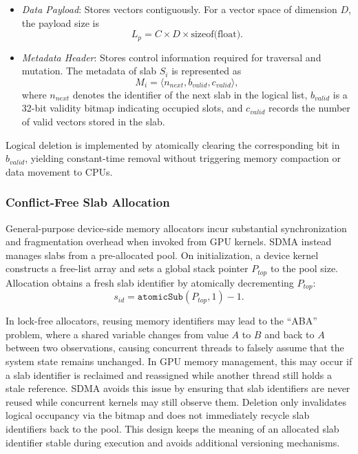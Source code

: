 \documentclass[sigconf,anonymous]{acmart}
\theoremstyle{plain}
\theoremstyle{definition}
\theoremstyle{remark}
\begin{document}
\begin{itemize}
    \item \textit{Data Payload}: Stores vectors contiguously. For a vector space of dimension $D$, the payload size is
    \[
        L_p = C \times D \times \text{sizeof(float)}.
    \]

    \item \textit{Metadata Header}: Stores control information required for traversal and mutation. The metadata of slab $S_i$ is represented as
    \begin{equation}
        M_i = \langle n_{next}, b_{valid}, c_{valid} \rangle,
    \end{equation}
    where $n_{next}$ denotes the identifier of the next slab in the logical list, $b_{valid}$ is a 32-bit validity bitmap indicating occupied slots, and $c_{valid}$ records the number of valid vectors stored in the slab.
\end{itemize}

Logical deletion is implemented by atomically clearing the corresponding bit in $b_{valid}$, yielding constant-time removal without triggering memory compaction or data movement to CPUs.

\subsubsection{Conflict-Free Slab Allocation}

General-purpose device-side memory allocators incur substantial synchronization and fragmentation overhead when invoked from GPU kernels. SDMA instead manages slabs from a pre-allocated pool. On initialization, a device kernel constructs a free-list array and sets a global stack pointer $P_{top}$ to the pool size. Allocation obtains a fresh slab identifier by atomically decrementing $P_{top}$:
\begin{equation}
    s_{id} = \texttt{atomicSub}(P_{top}, 1) - 1.
\end{equation}

In lock-free allocators, reusing memory identifiers may lead to the ``ABA'' problem, where a shared variable changes from value $A$ to $B$ and back to $A$ between two observations, causing concurrent threads to falsely assume that the system state remains unchanged. In GPU memory management, this may occur if a slab identifier is reclaimed and reassigned while another thread still holds a stale reference.
SDMA avoids this issue by ensuring that slab identifiers are never reused while concurrent kernels may still observe them. Deletion only invalidates logical occupancy via the bitmap and does not immediately recycle slab identifiers back to the pool. This design keeps the meaning of an allocated slab identifier stable during execution and avoids additional versioning mechanisms.
\end{document}
